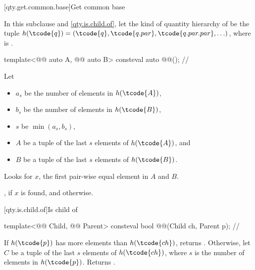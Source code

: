 [qty.get.common.base]{Get common base}

\pnum
In this subclause and \ref{qty.is.child.of},
let the kind of quantity hierarchy of  be the tuple
$h(\tcode{q}) = ( \tcode{q}, \tcode{q.par}, \tcode{q.par.par}, \ldots )$,
where  is .

\begin{itemdecl}
template<@@ auto A, @@ auto B>
consteval auto @@();  // \expos
\end{itemdecl}

\begin{itemdescr}
\pnum
Let
\begin{itemize}
\item
$a_s$ be the number of elements in $h(\tcode{A})$,
\item
$b_s$ be the number of elements in $h(\tcode{B})$,
\item
$s$ be $\operatorname{min}(a_s, b_s)$,
\item
$A$ be a tuple of the last $s$ elements of $h(\tcode{A})$, and
\item
$B$ be a tuple of the last $s$ elements of $h(\tcode{B})$.
\end{itemize}

\pnum
\effects
Looks for $x$, the first pair-wise equal element in $A$ and $B$.

\pnum
\returns
{}, if $x$ is found, and  otherwise.
\end{itemdescr}

[qty.is.child.of]{Is child of}

\begin{itemdecl}
template<@@ Child, @@ Parent>
consteval bool @@(Child ch, Parent p);  // \expos
\end{itemdecl}

\begin{itemdescr}
\pnum
\returns
If $h(\tcode{p})$ has more elements than $h(\tcode{ch})$, returns .
Otherwise, let $C$ be a tuple of the last $s$ elements of $h(\tcode{ch})$,
where $s$ is the number of elements in $h(\tcode{p})$.
Returns .
\end{itemdescr}

